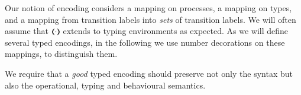 Our notion of encoding considers a mapping on processes, 
a mapping on types, %
and a mapping %
from transition labels 
into \emph{sets} of transition labels.
We will often assume that  $(\!\!\langle\cdot\rangle\!\!)$ extends to typing environments as expected.
As we will define several typed encodings,  
in the following we use number decorations on these mappings, to distinguish them.






%

We require that a {\em good} typed encoding should 
preserve not only the syntax but
also the operational, typing and behavioural
semantics. 


